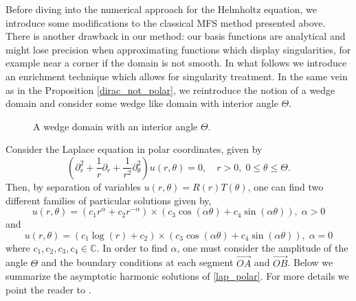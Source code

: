 Before diving into the numerical approach for the Helmholtz equation, we introduce some modifications to the classical \ac{MFS} method presented above. There is another drawback in our method: our basis functions are analytical and might lose precision when approximating functions which display singularities, for example near a corner if the domain is not smooth. In what follows we introduce an enrichment technique which allows for singularity treatment. In the same vein as in the Proposition \ref{dirac_not_polar}, we reintroduce the notion of a wedge domain and consider some wedge like domain with interior angle \(\Theta\).
    
\begin{figure}[H]
\centering
{}
\caption{A wedge domain with an interior angle \(\Theta\).}\label{wedge}
\end{figure}
Consider the Laplace equation in polar coordinates, given by
\begin{equation}\label{lap_polar}
    \left(\partial_r^2 + \frac{1}{r} \partial_r +\frac{1}{r^2}\partial_\theta^2\right)u(r,\theta) = 0, \quad r>0, \; 0 \leq \theta \leq \Theta.
\end{equation}
Then, by separation of variables \(u(r, \theta) = R(r) T(\theta)\), one can find two different families of particular solutions given by,
\[
    u(r,\theta) = \left(c_1 r^\alpha + c_2 r^{-\alpha}\right) \times \left(c_3 \cos(\alpha \theta) + c_4 \sin(\alpha \theta)\right), \; \alpha >0
\]
and
\[
    u(r,\theta) = \left(c_1 \log (r) + c_2 \right) \times \left(c_3 \cos(\alpha \theta) + c_4 \sin(\alpha \theta)\right), \; \alpha =0
\]
where \(c_1, c_2, c_3, c_4 \in \mathbb{C}\). In order to find \(\alpha\), one must consider the amplitude of the angle \(\Theta\) and the boundary conditions at each segment \(\overrightarrow{OA}\) and \(\overrightarrow{OB}\). Below we summarize the asymptotic harmonic solutions of \eqref{lap_polar}. For more details we point the reader to \cite{li2000singularities}.

